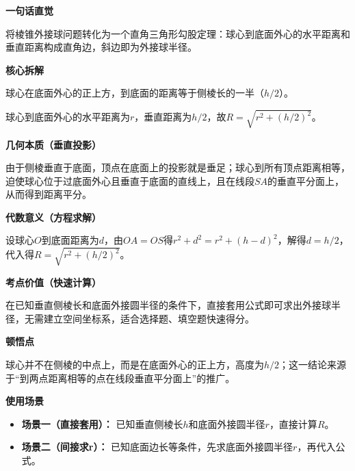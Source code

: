 \begin{explanationbox}

	\textbf{\textcolor{CExplanation}{一句话直觉}}

	将棱锥外接球问题转化为一个直角三角形勾股定理：球心到底面外心的水平距离和垂直距离构成直角边，斜边即为外接球半径。

	\medskip
	\textbf{\textcolor{CExplanation}{核心拆解}}
	\begin{description}[style=nextline, leftmargin=2.8em, labelsep=0.5em, itemsep=0.45em]
		\item[\textbf{要点一（球心定位）：}] 球心在底面外心的正上方，到底面的距离等于侧棱长的一半（$h/2$）。
		\item[\textbf{要点二（勾股计算）：}] 球心到底面外心的水平距离为$r$，垂直距离为$h/2$，故$R = \sqrt{r^{2} + (h/2)^{2}}$。
	\end{description}

	\medskip
	\textbf{\textcolor{CExplanation}{几何本质（垂直投影）}}

	由于侧棱垂直于底面，顶点在底面上的投影就是垂足；球心到所有顶点距离相等，迫使球心位于过底面外心且垂直于底面的直线上，且在线段$SA$的垂直平分面上，从而得到距离平分。

	\medskip
	\textbf{\textcolor{CExplanation}{代数意义（方程求解）}}

	设球心$O$到底面距离为$d$，由$OA = OS$得$r^{2}+d^{2} = r^{2}+(h-d)^{2}$，解得$d=h/2$，代入得$R = \sqrt{r^{2}+(h/2)^{2}}$。

	\medskip
	\textbf{\textcolor{CExplanation}{考点价值（快速计算）}}

	在已知垂直侧棱长和底面外接圆半径的条件下，直接套用公式即可求出外接球半径，无需建立空间坐标系，适合选择题、填空题快速得分。

	\medskip
	\textbf{\textcolor{CExplanation}{顿悟点}}

	球心并不在侧棱的中点上，而是在底面外心的正上方，高度为$h/2$；这一结论来源于“到两点距离相等的点在线段垂直平分面上”的推广。

	\medskip
	\textbf{\textcolor{CExplanation}{使用场景}}
	\begin{itemize}[leftmargin=*, itemsep=0.5em, topsep=0.4em]
		\item \textbf{场景一（直接套用）：} 已知垂直侧棱长$h$和底面外接圆半径$r$，直接计算$R$。
		\item \textbf{场景二（间接求r）：} 已知底面边长等条件，先求底面外接圆半径$r$，再代入公式。
	\end{itemize}
\end{explanationbox}
